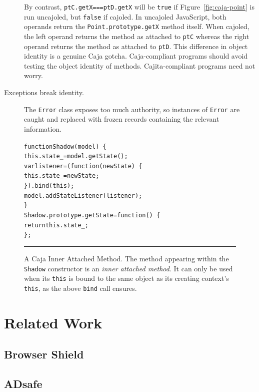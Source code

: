 \documentclass[letterpaper,twocolumn,10pt]{article}
\newcommand{\code}[1]{{\tt {#1}}}              %
\begin{document}
\begin{description}
  By contrast, \code{ptC.getX===ptD.getX} will be \code{true} if 
  Figure~\ref{fig:caja-point} is run uncajoled, but \code{false} if cajoled. 
  In uncajoled JavaScript, both operands return the 
  \code{Point.prototype.getX} method itself. When cajoled, the left operand 
  returns the method as attached to \code{ptC} whereas the right operand 
  returns the method as attached to \code{ptD}. This difference in 
  object identity is a genuine Caja gotcha. Caja-compliant programs should 
  avoid testing the object identity of methods. Cajita-compliant programs 
  need not worry.

  \item[Exceptions break identity.]  The \code{Error} class exposes too much
  authority, so instances of \code{Error} are caught and replaced with frozen
  records containing the relevant information.
\end{description}


\begin{figure}[t!]
\begin{alltt}
function Shadow(model)\ \{
  this.state_ = model.getState();
  var listener = (function(newState)\ \{
    this.state_ = newState;
  \}).bind(this);
  model.addStateListener(listener);
\}
Shadow.prototype.getState = function()\ \{
  return this.state_;
\};
\end{alltt}

\caption[A Caja Inner Attached Method.]{A Caja Inner Attached Method. The method 
appearing within the \code{Shadow} constructor is an \emph{inner attached method}. 
It can only be used when its \code{this} is bound to the same object as its 
creating context's \code{this}, as the above \code{bind} call ensures.\\ } 
\hrule
\label{fig:caja-attached-method}
\end{figure}


\section{Related Work}
\label{sec:related}

\subsection{Browser Shield}


\subsection{ADsafe}
\end{document}

